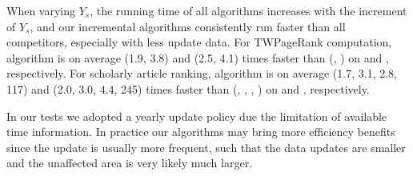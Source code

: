 When varying $Y_s$, the running time of all algorithms increases with the increment of $Y_s$, and our incremental algorithms
consistently run faster than all competitors, especially with less update data.
%
For TWPageRank computation, algorithm \inctwprscc is on average (1.9, 3.8) and (2.5, 4.1) times faster than (\twprscc, \powtwprscc) on \aminer and \magdata, respectively.
%
For scholarly article ranking, algorithm \incensemble is on average (1.7, 3.1, 2.8, 117) and (2.0, 3.0, 4.4, 245) times faster than (\batensemble, \powensemble, \futurerank, \hhgrank) on \aminer and \magdata, respectively.


In our tests we adopted a yearly update policy due the limitation of  available time information. In practice our algorithms may bring more efficiency benefits since the update is usually more frequent, such that the data updates are smaller and the unaffected area is very likely much larger.


